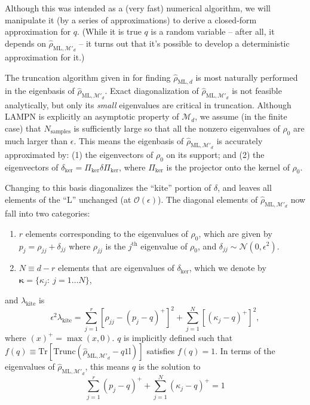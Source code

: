 \documentclass[aps,pra, twocolumn]{revtex4-1}
\newcommand{\M}{\mathcal{M}}
\newcommand{\Tr}{\mathrm{Tr}}
\newcommand{\Id}{\mathbb{I}}
\def\Id{1\!\mathrm{l}}
\newcommand{\bvec}[1]{\boldsymbol{#1}}
\newcommand{\rhohat}{\hat{\rho}}
\newcommand{\rhoML}[1]{\rhohat_{\scriptscriptstyle{\mathrm{ML},#1}}}
\begin{document}
Although this was intended as a (very fast) numerical algorithm, we will manipulate it (by a series of approximations) to derive a closed-form approximation for $q$. (While it is true $q$ is a random variable -- after all, it depends on $\rhoML{\M'_{d}}$ -- it turns out that it's possible to develop a deterministic approximation for it.)

The truncation algorithm given in \cite{Smolin2012} for finding $\rhoML{d}$ is most naturally performed in the eigenbasis of $\rhoML{\M'_{d}}$.  Exact diagonalization of $\rhoML{\M'_{d}}$ is not feasible analytically, but only its \emph{small} eigenvalues are critical in truncation.  Although  LAMPN is explicitly an asymptotic property of $\M_{d}$, we assume (in the finite case) that $N_{\mathrm{samples}}$ is sufficiently large so that all the nonzero eigenvalues of $\rho_0$ are much larger than $\epsilon$. This means the eigenbasis of $\rhoML{\M'_{d}}$ is accurately approximated by: (1) 
the eigenvectors of $\rho_0$ on its support; and (2) the eigenvectors of $\delta_{\mathrm{ker}} = \Pi_{\mathrm{ker}}\delta\Pi_{\mathrm{ker}}$, where $\Pi_{\mathrm{ker}}
$ is the projector onto the kernel of $\rho_0$.

Changing to this basis diagonalizes the ``kite'' portion of $\delta$, and leaves all elements of the ``L'' unchanged (at $\mathcal{O}(\epsilon)$).  The diagonal elements of $\rhoML{\M'_{d}}$ now fall into two categories:
\begin{enumerate}[noitemsep]
\item $r$ elements corresponding to the eigenvalues of $\rho_0$, which are given by $p_{j} = \rho_{jj} + \delta_{jj}$ where  $\rho_{jj}$ is the $j^{\mathrm{th}}$ eigenvalue of $\rho_{0}$, and $\delta_{jj} \sim \mathcal{N}(0,\epsilon^2)$.
\item $N \equiv d-r$ elements that are eigenvalues of $\delta_{\mathrm{ker}}$, which we denote by $\bvec{\kappa} = \{\kappa_j:~j = 1\ldots 
N\}$,
\end{enumerate}
and $\lambda_{\mathrm{kite}}$ is
\begin{equation}
\label{eq:llrs_kite}
\epsilon^{2}\lambda_{\mathrm{kite}} = \sum_{j=1}^{r}[\rho_{jj}- (p_j-q)^{+}]^2 + \sum_{j=1}^{N}\left[(\kappa_j-q)^+\right]^2,
\end{equation}
where $(x)^{+} = \max(x, 0)$. $q$ is implicitly defined such that $f(q) \equiv \Tr\left[\mathrm{Trunc}(\rhoML{\M'_{d}} - q \Id)\right]$ satisfies $f(q) = 1$. In terms of the eigenvalues of $\rhoML{\M'_{d}}$, this means $q$ is the solution to
\begin{equation}
\label{eq:q_eqn}
 \sum_{j=1}^{r}(p_j - q)^{+} + \sum_{j=1}^{N}{(\kappa_j-q)^+} = 1
\end{equation}
\end{document}
